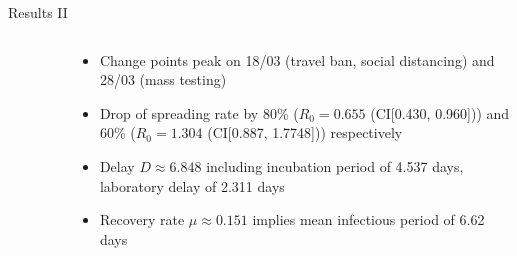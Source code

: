 \documentclass{beamer}
\begin{document}
\begin{frame}{Results II}
	
	\begin{columns}
		\begin{column}{0.65\textwidth}
			\begin{figure}
			
			\centering
			\end{figure}
		\end{column}
		\begin{column}{0.5\textwidth}
			\begin{itemize}
				\footnotesize
				\item<2-> Change points peak on 18/03 (travel ban, social distancing) and 28/03 (mass testing) 
				\item<3-> Drop of spreading rate by 80\% ($R_0=0.655$ (CI[0.430, 0.960])) and 60\% ($R_0=1.304$ (CI[0.887, 1.7748])) respectively 
				\item<4-> Delay $D\approx 6.848$ including incubation period of 4.537 days, laboratory delay of 2.311 days
				\item<5-> Recovery rate $\mu \approx 0.151$ implies mean infectious period of 6.62 days 
			\end{itemize}
		\end{column}
	\end{columns}
	
\end{frame}
\end{document}
